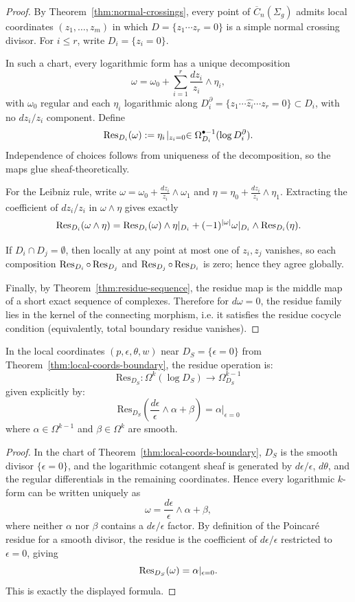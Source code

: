 \begin{proof}
By Theorem~\ref{thm:normal-crossings}, every point of $\overline{C}_n(\Sigma_g)$
admits local coordinates $(z_1,\dots,z_m)$ in which
$D=\{z_1\cdots z_r=0\}$ is a simple normal crossing divisor.
For $i\le r$, write $D_i=\{z_i=0\}$.

In such a chart, every logarithmic form has a unique decomposition
\[
\omega=\omega_0+\sum_{i=1}^r \frac{dz_i}{z_i}\wedge \eta_i,
\]
with $\omega_0$ regular and each $\eta_i$ logarithmic along
$D_i^\partial=\{z_1\cdots \widehat{z_i}\cdots z_r=0\}\subset D_i$, with no
$dz_i/z_i$ component. Define
\[
\operatorname{Res}_{D_i}(\omega):=\eta_i\!\mid_{z_i=0}\in
\Omega^{\bullet-1}_{D_i}(\log D_i^\partial).
\]
Independence of choices follows from uniqueness of the decomposition, so the maps
glue sheaf-theoretically.

For the Leibniz rule, write
$\omega=\omega_0+\frac{dz_i}{z_i}\wedge\omega_1$ and
$\eta=\eta_0+\frac{dz_i}{z_i}\wedge\eta_1$.
Extracting the coefficient of $dz_i/z_i$ in $\omega\wedge\eta$ gives exactly
\[
\operatorname{Res}_{D_i}(\omega\wedge\eta)=
\operatorname{Res}_{D_i}(\omega)\wedge \eta|_{D_i}
 +(-1)^{|\omega|}\omega|_{D_i}\wedge\operatorname{Res}_{D_i}(\eta).
\]

If $D_i\cap D_j=\emptyset$, then locally at any point at most one of $z_i,z_j$
vanishes, so each composition
$\operatorname{Res}_{D_i}\circ\operatorname{Res}_{D_j}$ and $\operatorname{Res}_{D_j}\circ\operatorname{Res}_{D_i}$ is zero; hence they
agree globally.

Finally, by Theorem~\ref{thm:residue-sequence}, the residue map is the middle map
of a short exact sequence of complexes. Therefore for $d\omega=0$, the residue
family lies in the kernel of the connecting morphism, i.e. it satisfies the
residue cocycle condition (equivalently, total boundary residue vanishes).
\end{proof}

\begin{proposition}\label{prop:residue-local}
In the local coordinates $(p, \epsilon, \theta, w)$ near $D_S = \{\epsilon = 0\}$ from Theorem~\ref{thm:local-coords-boundary}, the residue operation is:
\[\text{Res}_{D_S}: \Omega^k(\log D_S) \to \Omega^{k-1}_{D_S}\]
given explicitly by:
\[\text{Res}_{D_S}\left(\frac{d\epsilon}{\epsilon} \wedge \alpha + \beta\right) = \alpha|_{\epsilon=0}\]
where $\alpha \in \Omega^{k-1}$ and $\beta \in \Omega^k$ are smooth.
\end{proposition}

\begin{proof}
In the chart of Theorem~\ref{thm:local-coords-boundary}, $D_S$ is the smooth
divisor $\{\epsilon=0\}$, and the logarithmic cotangent sheaf is generated by
$d\epsilon/\epsilon$, $d\theta$, and the regular differentials in the remaining
coordinates. Hence every logarithmic $k$-form can be written uniquely as
\[
\omega=\frac{d\epsilon}{\epsilon}\wedge\alpha+\beta,
\]
where neither $\alpha$ nor $\beta$ contains a $d\epsilon/\epsilon$ factor.
By definition of the Poincar\'e residue for a smooth divisor, the residue is the
coefficient of $d\epsilon/\epsilon$ restricted to $\epsilon=0$, giving
\[
\operatorname{Res}_{D_S}(\omega)=\alpha|_{\epsilon=0}.
\]
This is exactly the displayed formula.
\end{proof}

